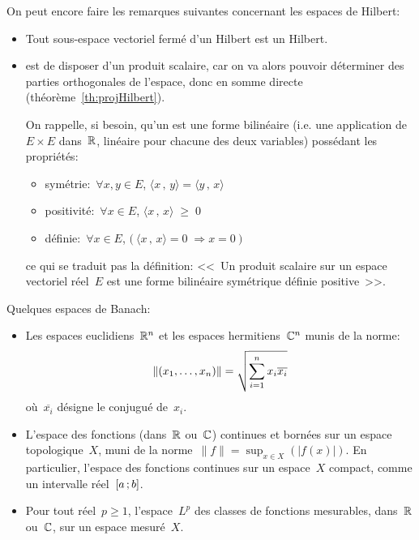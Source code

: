 \medskip
On peut encore faire les remarques suivantes concernant les espaces de Hilbert:
\begin{itemize}
  \item Tout sous-espace vectoriel fermé d'un Hilbert est un Hilbert.
  \item {} est de disposer d'un produit scalaire, car on va alors pouvoir déterminer des parties
	orthogonales de l'espace, donc en somme directe (théorème~\ref{th:projHilbert}).

	On rappelle, si besoin, qu'un  est une
	forme bilinéaire (i.e. une application de~$E\times E$
	dans~$\mathbb R$, linéaire pour chacune des deux variables) possédant les propriétés:
	\begin{itemize}
	  \item symétrie:~$\forall x,y \in E$, $\langle x\, , \, y \rangle = \langle y\, , \, x\rangle$
	  \item positivité:~$\forall x \in E$, $\langle x\, , \, x \rangle \; \ge \; 0$
	  \item définie:~$\forall x \in E$, $\big(\ \langle x\, , \, x \rangle = 0 \; \Rightarrow x = 0\ \big)$
	\end{itemize}
	ce qui se traduit pas la définition: <<~Un produit scalaire sur un espace vectoriel réel~$E$ est une
	forme bilinéaire symétrique définie positive~>>.
\end{itemize}


\medskip
Quelques espaces de Banach:
\begin{itemize}
\item Les espaces euclidiens~$\mathbb R^n$ et
les espaces hermitiens~$\mathbb C^n$
munis de la norme:
\begin{equation}\|(x_1,\ldots,x_n)\| = \sqrt{\displaystyle\sum_{i=1}^n x_i \overline{x_i}}\end{equation} où~$\overline{x_i}$
désigne le conjugué de~$x_i$.

\item L'espace des fonctions (dans~$\mathbb R$ ou~$\mathbb C$) continues et bornées sur un espace topologique~$X$,
muni de la norme~$\|f\| = \sup_{x \in X}(|f(x)|)$.
En particulier, l'espace des fonctions continues sur un espace~$X$ compact, comme un intervalle réel~$\mathopen{[}a\,;b\mathclose{]}$.

\item Pour tout réel~$p \ge 1$, l'espace~$L^p$ des classes de fonctions mesurables, dans~$\mathbb R$ ou~$\mathbb C$, sur un espace mesuré~$X$.
\end{itemize}

